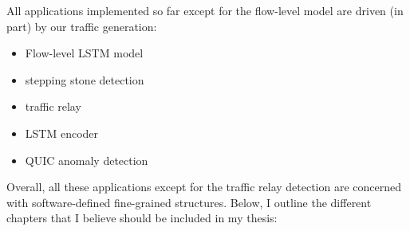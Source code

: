 \documentclass[a4paper,12pt,twoside]{article}
\begin{document}
All applications implemented so far except for the flow-level model are driven (in part) by our traffic generation:
\begin{itemize}
\item Flow-level LSTM model

\item stepping stone detection
\item traffic relay
\item LSTM encoder
\item QUIC anomaly detection
\end{itemize}

Overall, all these applications except for the traffic relay detection are concerned with software-defined fine-grained structures. Below, I outline the different chapters that I believe should be included in my thesis:
\end{document}
